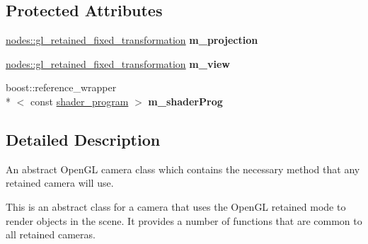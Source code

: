 \subsection*{Protected Attributes}
\begin{DoxyCompactItemize}
\item 
\hypertarget{classoccluded_1_1opengl_1_1retained_1_1scene_1_1objects_1_1gl__retained__camera_a2791ba7456142bcf10413574c5019f76}{\hyperlink{classoccluded_1_1opengl_1_1retained_1_1scene_1_1nodes_1_1gl__retained__fixed__transformation}{nodes\+::gl\+\_\+retained\+\_\+fixed\+\_\+transformation} {\bfseries m\+\_\+projection}}\label{classoccluded_1_1opengl_1_1retained_1_1scene_1_1objects_1_1gl__retained__camera_a2791ba7456142bcf10413574c5019f76}

\item 
\hypertarget{classoccluded_1_1opengl_1_1retained_1_1scene_1_1objects_1_1gl__retained__camera_ab76197cac9c1a7d80dc5e7176d94d35c}{\hyperlink{classoccluded_1_1opengl_1_1retained_1_1scene_1_1nodes_1_1gl__retained__fixed__transformation}{nodes\+::gl\+\_\+retained\+\_\+fixed\+\_\+transformation} {\bfseries m\+\_\+view}}\label{classoccluded_1_1opengl_1_1retained_1_1scene_1_1objects_1_1gl__retained__camera_ab76197cac9c1a7d80dc5e7176d94d35c}

\item 
\hypertarget{classoccluded_1_1opengl_1_1retained_1_1scene_1_1objects_1_1gl__retained__camera_a9701f11b1eb2cdcca43796a093cc17cf}{boost\+::reference\+\_\+wrapper\\*
$<$ const \hyperlink{classoccluded_1_1opengl_1_1retained_1_1shaders_1_1shader__program}{shader\+\_\+program} $>$ {\bfseries m\+\_\+shader\+Prog}}\label{classoccluded_1_1opengl_1_1retained_1_1scene_1_1objects_1_1gl__retained__camera_a9701f11b1eb2cdcca43796a093cc17cf}

\end{DoxyCompactItemize}


\subsection{Detailed Description}
An abstract Open\+G\+L camera class which contains the necessary method that any retained camera will use. 

This is an abstract class for a camera that uses the Open\+G\+L retained mode to render objects in the scene. It provides a number of functions that are common to all retained cameras. 

